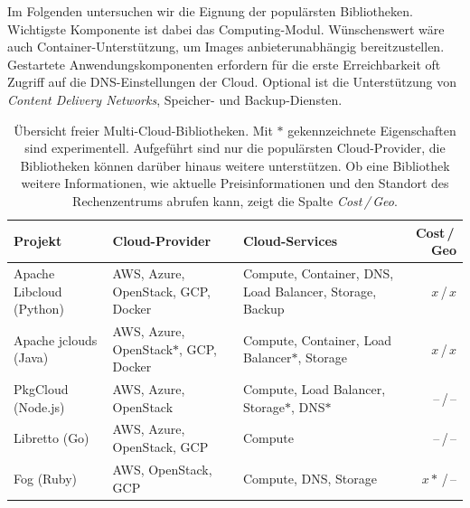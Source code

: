 Im Folgenden untersuchen wir die Eignung der populärsten Bibliotheken. Wichtigste Komponente ist dabei das Computing-Modul. Wünschenswert wäre auch Container-Unterstützung, um Images anbieterunabhängig bereitzustellen. Gestartete Anwendungskomponenten erfordern für die erste Erreichbarkeit oft Zugriff auf die DNS-Einstellungen der Cloud. Optional ist die Unterstützung von \emph{Content Delivery Networks}, Speicher- und Backup-Diensten.

\begin{table}\centering
	\begin{minipage}{\textwidth}
	\caption{Übersicht freier Multi-Cloud-Bibliotheken. Mit $*$ gekennzeichnete Eigenschaften sind experimentell. Aufgeführt sind nur die populärsten Cloud-Provider, die Bibliotheken können darüber hinaus weitere unterstützen. Ob eine Bibliothek weitere Informationen, wie aktuelle Preisinformationen und den Standort des Rechenzentrums abrufen kann, zeigt die Spalte \emph{Cost\,/\,Geo}.}
	\begin{tabularx}{\textwidth}{>{\centering}XXXr} \toprule
		Projekt & Cloud-Provider & Cloud-Services & Cost\,/\,Geo\\ \midrule
		Apache Libcloud (Python)\footnotemark & AWS, Azure, OpenStack, GCP, Docker & Compute, Container, DNS, Load Balancer, Storage, Backup & $x$\,/\,$x$\\
		Apache jclouds (Java)\footnotemark & AWS, Azure, Open\-Stack$*$, GCP, Docker & Compute, Container, Load Balancer$*$, Storage & $x$\,/\,$x$\\
		PkgCloud (Node.js)\footnotemark & AWS, Azure, OpenStack& Compute, Load Balancer, Storage$*$, DNS$*$ & --\,/\,--\\
		Libretto (Go)\footnotemark & AWS, Azure, OpenStack, GCP & Compute & --\,/\,--\\
		Fog (Ruby)\footnotemark & AWS, OpenStack, GCP & Compute, DNS, Storage & $x*$\,/\,--\\
		\bottomrule
	\end{tabularx}
	\label{tab:bibliotheken}
	\vspace{150pt}
\end{minipage}  
\end{table}

